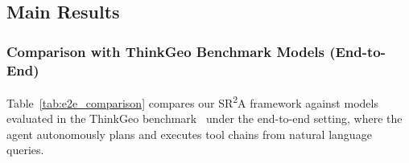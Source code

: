 \documentclass[journal]{IEEEtran}
\begin{document}
\subsection{Main Results}
\label{subsec:main_results}

\subsubsection{Comparison with ThinkGeo Benchmark Models (End-to-End)}

Table~\ref{tab:e2e_comparison} compares our SR\textsuperscript{2}A framework against models evaluated in the ThinkGeo benchmark~\cite{ThinkGeo} under the end-to-end setting, where the agent autonomously plans and executes tool chains from natural language queries.

\begin{table}[t]
\centering
\caption{End-to-End Comparison on the ThinkGeo Benchmark. All models autonomously plan and execute tool chains from natural language queries and RS images. Step-by-step metrics (Inst.: instruction following, Tool.: tool selection, Arg.: argument accuracy, Summ.: summary quality) and end-to-end answer accuracy (Ans.\ I: answer accuracy with image grounding) are reported. Results for baseline models are from~\cite{ThinkGeo}. Our SR\textsuperscript{2}A uses Qwen3-VL-30B-A3B as backbone.}
\label{tab:e2e_comparison}
\end{table}
\end{document}

